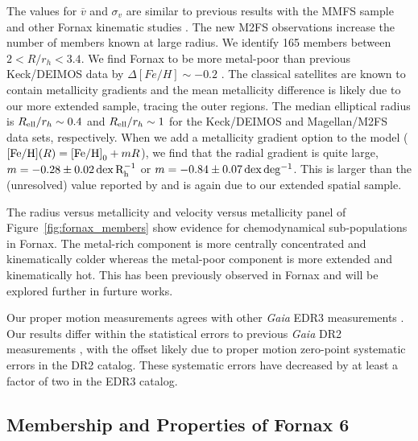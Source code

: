 \documentclass[twocolumn]{aastex63}
\begin{document}
The values for $\overline{v}$ and $\sigma_v$ are similar to previous results with the MMFS sample \citep{Walker2009ApJ...704.1274W} and other Fornax kinematic studies \citep[e.g.,][]{Battaglia2006A&A...459..423B}.
The new M2FS observations increase the number of members known at large radius. 
We identify 165 members between $2 < R/r_h < 3.4$.
We find Fornax to be more metal-poor than previous Keck/DEIMOS data by $\Delta [Fe/H] \sim -0.2$ \citep{Kirby2013ApJ...779..102K}. The classical satellites are known to contain metallicity gradients \citep{Kirby2011ApJ...727...78K} and the mean metallicity difference is likely due to our more extended sample, tracing the outer regions. 
The median elliptical radius is $R_{\rm ell}/r_h\sim0.4$ and $R_{\rm ell}/r_h\sim1$ for the Keck/DEIMOS and Magellan/M2FS data sets, respectively.
When we add a metallicity gradient option to the model (${\rm [Fe/H]}(R)={\rm [Fe/H]}_0 + m R$), we find that the radial gradient is quite large, $m=-0.28\pm0.02 \,{\rm dex \, R_h^{-1}}$ or $m=-0.84\pm0.07 \, {\rm dex \, deg^{-1}}$.
This is  larger than the (unresolved) value reported by  \citet{Kirby2011ApJ...727...78K} and is again due to our extended spatial sample.

The radius versus metallicity and velocity versus metallicity panel of Figure~\ref{fig:fornax_members} show evidence for chemodynamical sub-populations in Fornax. The metal-rich component is more centrally concentrated and kinematically colder whereas the metal-poor component is more extended and kinematically hot.  
This has been previously observed in Fornax \cite[e.g.][]{Battaglia2006A&A...459..423B, Walker2011ApJ...742...20W} and will be explored further in furture works.




Our proper motion measurements agrees with other {\it Gaia} EDR3  measurements \citep{McConnachie2020RNAAS...4..229M, Vitral2021MNRAS.504.1355V}. 
Our results differ within the statistical errors to previous {\it Gaia} DR2 measurements \citep{GaiaHelmi2018A&A...616A..12G, Fritz2018A&A...619A.103F}, with the offset likely due to proper motion zero-point systematic errors in the DR2 catalog. 
These systematic errors have decreased by at least a factor of two in the EDR3 catalog.  




\subsection{Membership and Properties of Fornax 6}
\label{sec:member_f6}
\end{document}
